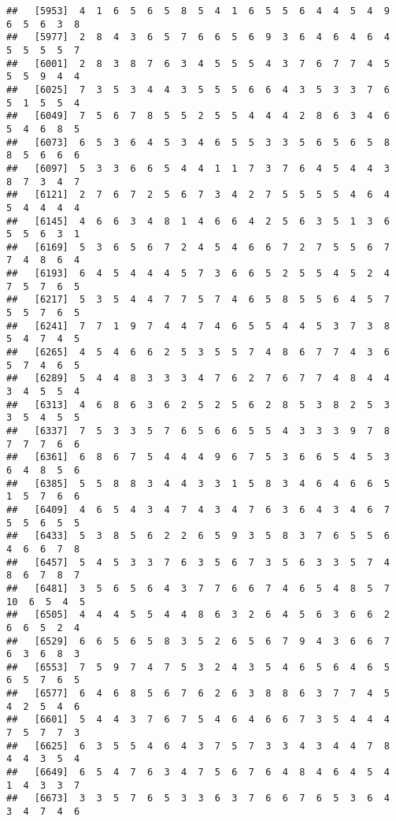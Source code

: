 \documentclass[
]{book}
\begin{document}
\begin{verbatim}
##   [5953]  4  1  6  5  6  5  8  5  4  1  6  5  5  6  4  4  5  4  9  6  5  6  3  8
##   [5977]  2  8  4  3  6  5  7  6  6  5  6  9  3  6  4  6  4  6  4  5  5  5  5  7
##   [6001]  2  8  3  8  7  6  3  4  5  5  5  4  3  7  6  7  7  4  5  5  5  9  4  4
##   [6025]  7  3  5  3  4  4  3  5  5  5  6  6  4  3  5  3  3  7  6  5  1  5  5  4
##   [6049]  7  5  6  7  8  5  5  2  5  5  4  4  4  2  8  6  3  4  6  5  4  6  8  5
##   [6073]  6  5  3  6  4  5  3  4  6  5  5  3  3  5  6  5  6  5  8  8  5  6  6  6
##   [6097]  5  3  3  6  6  5  4  4  1  1  7  3  7  6  4  5  4  4  3  8  7  3  4  7
##   [6121]  2  7  6  7  2  5  6  7  3  4  2  7  5  5  5  5  4  6  4  5  4  4  4  4
##   [6145]  4  6  6  3  4  8  1  4  6  6  4  2  5  6  3  5  1  3  6  5  5  6  3  1
##   [6169]  5  3  6  5  6  7  2  4  5  4  6  6  7  2  7  5  5  6  7  7  4  8  6  4
##   [6193]  6  4  5  4  4  4  5  7  3  6  6  5  2  5  5  4  5  2  4  7  5  7  6  5
##   [6217]  5  3  5  4  4  7  7  5  7  4  6  5  8  5  5  6  4  5  7  5  5  7  6  5
##   [6241]  7  7  1  9  7  4  4  7  4  6  5  5  4  4  5  3  7  3  8  5  4  7  4  5
##   [6265]  4  5  4  6  6  2  5  3  5  5  7  4  8  6  7  7  4  3  6  5  7  4  6  5
##   [6289]  5  4  4  8  3  3  3  4  7  6  2  7  6  7  7  4  8  4  4  3  4  5  5  4
##   [6313]  4  6  8  6  3  6  2  5  2  5  6  2  8  5  3  8  2  5  3  3  5  4  5  5
##   [6337]  7  5  3  3  5  7  6  5  6  6  5  5  4  3  3  3  9  7  8  7  7  7  6  6
##   [6361]  6  8  6  7  5  4  4  4  9  6  7  5  3  6  6  5  4  5  3  6  4  8  5  6
##   [6385]  5  5  8  8  3  4  4  3  3  1  5  8  3  4  6  4  6  6  5  1  5  7  6  6
##   [6409]  4  6  5  4  3  4  7  4  3  4  7  6  3  6  4  3  4  6  7  5  5  6  5  5
##   [6433]  5  3  8  5  6  2  2  6  5  9  3  5  8  3  7  6  5  5  6  4  6  6  7  8
##   [6457]  5  4  5  3  3  7  6  3  5  6  7  3  5  6  3  3  5  7  4  8  6  7  8  7
##   [6481]  3  5  6  5  6  4  3  7  7  6  6  7  4  6  5  4  8  5  7 10  6  5  4  5
##   [6505]  4  4  4  5  5  4  4  8  6  3  2  6  4  5  6  3  6  6  2  6  6  5  2  4
##   [6529]  6  6  5  6  5  8  3  5  2  6  5  6  7  9  4  3  6  6  7  6  3  6  8  3
##   [6553]  7  5  9  7  4  7  5  3  2  4  3  5  4  6  5  6  4  6  5  6  5  7  6  5
##   [6577]  6  4  6  8  5  6  7  6  2  6  3  8  8  6  3  7  7  4  5  4  2  5  4  6
##   [6601]  5  4  4  3  7  6  7  5  4  6  4  6  6  7  3  5  4  4  4  7  5  7  7  3
##   [6625]  6  3  5  5  4  6  4  3  7  5  7  3  3  4  3  4  4  7  8  4  4  3  5  4
##   [6649]  6  5  4  7  6  3  4  7  5  6  7  6  4  8  4  6  4  5  4  1  4  3  3  7
##   [6673]  3  3  5  7  6  5  3  3  6  3  7  6  6  7  6  5  3  6  4  3  4  7  4  6

\end{verbatim}
\end{document}
